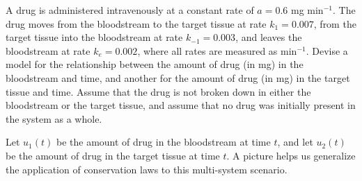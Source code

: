 \documentclass[../book.tex]{subfiles}
\begin{document}
\begin{example} \label{eg:sys-1}
A drug is administered intravenously at a constant rate of \(a = 0.6\) mg min\(^{-1}\). The drug moves from the bloodstream to the target tissue at rate \(k_{1} = 0.007\), from the target tissue into the bloodstream at rate \(k_{-1} = 0.003\), and leaves the bloodstream at rate \(k_e = 0.002\), where all rates are measured as min\(^{-1}\). Devise a model for the relationship between the amount of drug (in mg) in the bloodstream and time, and another for the amount of drug (in mg) in the target tissue and time. Assume that the drug is not broken down in either the bloodstream or the target tissue, and assume that no drug was initially present in the system as a whole.
\end{example}
\begin{solution}
Let \(u_1(t)\) be the amount of drug in the bloodstream at time \(t\), and let \(u_2(t)\) be the amount of drug in the target tissue at time \(t\). A picture helps us generalize the application of conservation laws to this multi-system scenario.
\begin{center}
\end{center} 


\end{solution}
\end{document}
